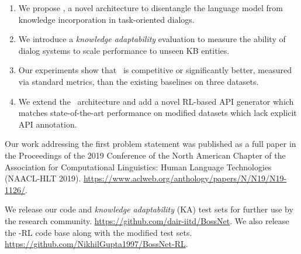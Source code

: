\begin{enumerate}
 \item We propose \sys, a novel architecture to disentangle the language model from knowledge incorporation in task-oriented dialogs.
 \item We introduce a {\em knowledge adaptability} evaluation to measure the ability of dialog systems to scale performance to unseen KB entities.
 \item Our experiments show that \sys\ is competitive or significantly better, measured via standard metrics, than the existing baselines on three datasets.
 \item We extend the \sys\ architecture and add a novel RL-based API generator which matches state-of-the-art performance on modified datasets which lack explicit API annotation.
\end{enumerate}

Our work addressing the first problem statement was published as a full paper in the Proceedings of the 2019 Conference of the North American Chapter of the Association for Computational Linguistics: Human Language Technologies (NAACL-HLT 2019). \url{https://www.aclweb.org/anthology/papers/N/N19/N19-1126/}.

We release our code and {\em knowledge adaptability} (KA) test sets for further use by the research community. \url{ https://github.com/dair-iitd/BossNet}. We also release the \sys -RL code base along with the modified test sets. \url{ https://github.com/NikhilGupta1997/BossNet-RL}.

